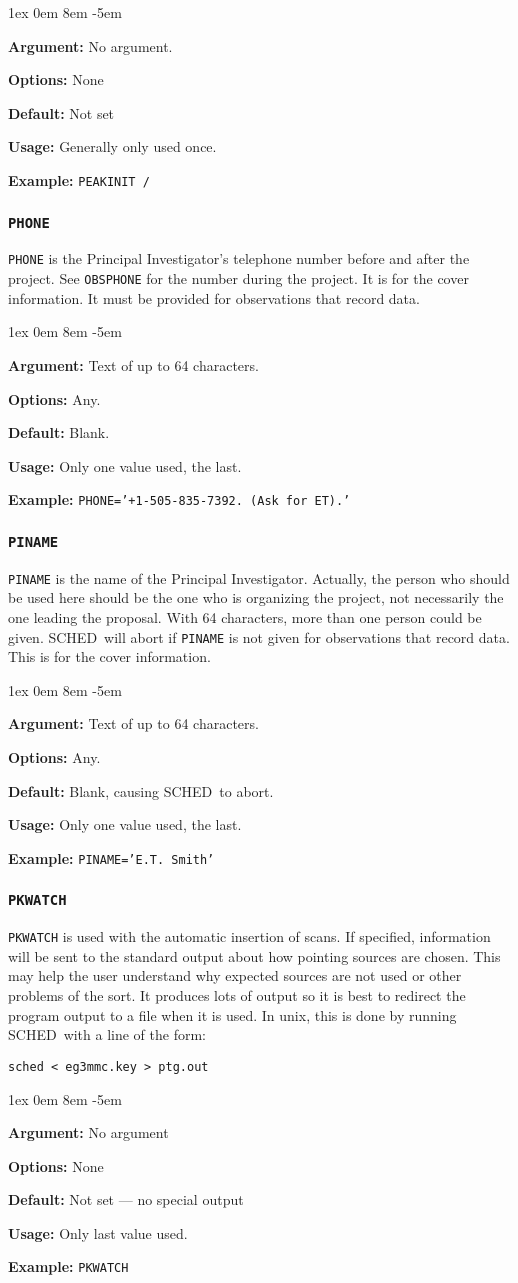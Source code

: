 \documentclass{report}
\newcommand{\schedb}{{\sc SCHED~}}
\newcommand{\rcwbox}[5]{
  \begin{list}{}{\parsep 1ex  \itemsep 0em
                 \leftmargin 8em  \itemindent -5em }
    \item {\bf Argument:} #1
    \item {\bf Options:}  #2
    \item {\bf Default:}  #3
    \item {\bf Usage:}    #4
    \item {\bf Example:}  #5
  \end{list}
}
\begin{document}
\rcwbox
{No argument.}
{None}
{Not set}
{Generally only used once.}
{{\tt PEAKINIT /}}


\subsubsection{\label{MP:PHONE}{\tt PHONE}}

{\tt PHONE} is the  Principal Investigator's telephone number before
and after the project. See {\tt OBSPHONE} for the number during the
project.  It is for the cover information.  It must be provided for
observations that record data.

\rcwbox
{Text of up to 64 characters.}
{Any.}
{Blank.}
{Only one value used, the last.}
{{\tt PHONE='+1-505-835-7392. (Ask for ET).'}}


\subsubsection{\label{MP:PINAME}{\tt PINAME}}

{\tt PINAME} is the name of the Principal Investigator.  Actually,
the person who should be used here should be the one who is organizing
the project, not necessarily the one leading the proposal.  With 64
characters, more than one person could be given. \schedb will
abort if {\tt PINAME} is not given for observations that record data.
This is for the cover information.

\rcwbox
{Text of up to 64 characters.}
{Any.}
{Blank, causing \schedb to abort.}
{Only one value used, the last.}
{{\tt PINAME='E.T. Smith'}}


\subsubsection{\label{MP:PKWATCH}{\tt PKWATCH}}

{\tt PKWATCH} is used with the automatic insertion of  scans.  If specified, information will be sent
to the standard output about how pointing sources are chosen.  This
may help the user understand why expected sources are not used or
other problems of the sort.  It produces lots of output so it is best
to redirect the program output to a file when it is used.  In unix, this
is done by running \schedb with a line of the form:

{\tt sched < eg3mmc.key > ptg.out}

\rcwbox
{No argument}
{None}
{Not set --- no special output}
{Only last value used.}
{{\tt PKWATCH}}
\end{document}
